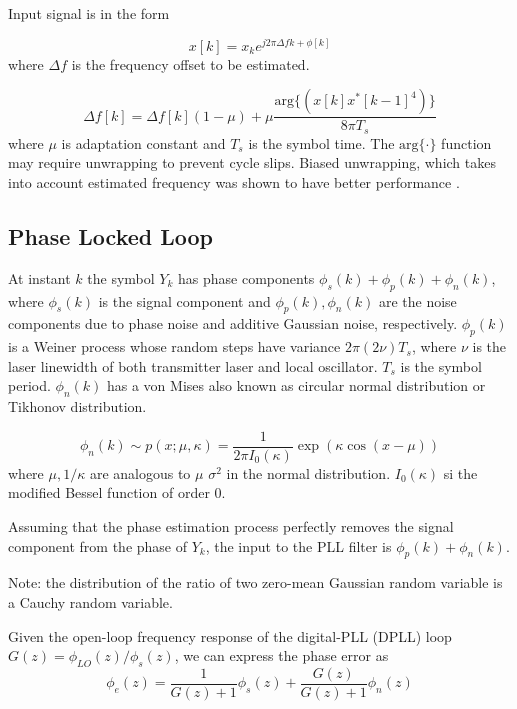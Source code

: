 \documentclass[a4paper]{article}
\begin{document}
Input signal is in the form

\begin{equation}
x[k] = x_ke^{j2\pi\Delta fk + \phi[k]}
\end{equation}
where $\Delta f$ is the frequency offset to be estimated.

\begin{equation}
\Delta f[k] = \Delta f[k](1-\mu) + \mu\frac{\mathrm{arg}\{(x[k]x^*[k-1]^4)\}}{8\pi T_s}
\end{equation}
where $\mu$ is adaptation constant and $T_s$ is the symbol time. The $\mathrm{arg}\{\cdot\}$ function may require unwrapping to prevent cycle slips. Biased unwrapping, which takes into account estimated frequency was shown to have better performance \cite{Hoffmann2008}.

\subsection{Phase Locked Loop}

At instant $k$ the symbol $Y_k$ has phase components $\phi_s(k) + \phi_p(k) + \phi_n(k)$, where $\phi_s(k)$ is the signal component and  $\phi_p(k), \phi_n(k)$ are the noise components due to phase noise and additive Gaussian noise, respectively. $\phi_p(k)$ is a Weiner process whose random steps have variance $2\pi(2\nu)T_s$, where $\nu$ is the laser linewidth of both transmitter laser and local oscillator. $T_s$ is the symbol period. $\phi_n(k)$ has a von Mises also known as circular normal distribution or Tikhonov distribution.

\begin{equation} \label{eq:Tikhonov-pdf}
	\phi_n(k) \sim p(x; \mu, \kappa) = \frac{1}{2\pi I_0(\kappa)}\exp(\kappa\cos(x-\mu))
\end{equation}
where $\mu, 1/\kappa$ are analogous to $\mu$ $\sigma^2$ in the normal distribution. $I_0(\kappa)$ si the modified Bessel function of order 0.

Assuming that the phase estimation process perfectly removes the signal component from the phase of $Y_k$, the input to the PLL filter is $\phi_p(k) + \phi_n(k)$.

Note: the distribution of the ratio of two zero-mean Gaussian random variable is a Cauchy random variable.

Given the open-loop frequency response of the digital-PLL (DPLL) loop $G(z) = \phi_{LO}(z)/\phi_s(z)$, we can express the phase error as
\begin{equation}
	\phi_e(z) = \frac{1}{G(z)+1}\phi_s(z) + \frac{G(z)}{G(z) + 1}\phi_n(z)
\end{equation}
\end{document}

